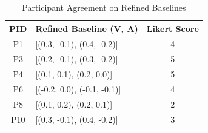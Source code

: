 \begin{table}[H]
\centering
\caption{Participant Agreement on Refined Baselines}
\begin{tabular}{|c|p{5cm}|c|}
\hline
\textbf{PID} & \textbf{Refined Baseline (V, A)} & \textbf{Likert Score} \\
\hline
P1 & [(0.3, -0.1), (0.4, -0.2)] & 4 \\
P3 & [(0.2, -0.1), (0.3, -0.2)] & 5 \\
P4 & [(0.1, 0.1), (0.2, 0.0)] & 5 \\
P6 & [(-0.2, 0.0), (-0.1, -0.1)] & 4 \\
P8 & [(0.1, 0.2), (0.2, 0.1)] & 2 \\
P10 & [(0.3, -0.1), (0.4, -0.2)] & 3 \\
\hline
\end{tabular}
\end{table}